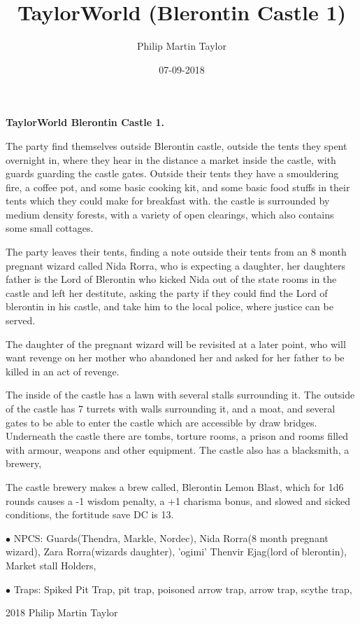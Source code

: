 \documentclass[12pt,a4paper]{book}
\date{07-09-2018}
\author{Philip Martin Taylor}
\title{TaylorWorld (Blerontin Castle 1)}
\begin{document}
\begin{center}
\textbf{TaylorWorld\texttrademark \: Blerontin Castle 1.}
\end{center}
\begin{flushleft}
  The party find themselves outside Blerontin castle, outside the tents they spent overnight in, where they hear in the distance a market inside the castle, with guards guarding the castle gates. Outside their tents they have a smouldering fire, a coffee pot, and some basic cooking kit, and some basic food stuffs in their tents which they could make for breakfast with. the castle is surrounded by medium density forests, with a variety of open clearings, which also contains some small cottages.
\end{flushleft}
\begin{flushleft}
  The party leaves their tents, finding a note outside their tents from an 8 month pregnant wizard called Nida Rorra, who is expecting a daughter, her daughters father is the Lord of Blerontin who kicked Nida out of the state rooms in the castle and left her destitute, asking the party if they could find the Lord of blerontin in his castle, and take him to the local police, where justice can be served.
\end{flushleft}
\begin{flushleft}
  The daughter of the pregnant wizard will be revisited at a later point, who will want revenge on her mother who abandoned her and asked for her father to be killed in an act of revenge.
\end{flushleft}
\begin{flushleft}
  The inside of the castle has a lawn with several stalls surrounding it. The outside of the castle has 7 turrets with walls surrounding it, and a moat, and several gates to be able to enter the castle which are accessible by draw bridges. Underneath the castle there are tombs, torture rooms, a prison and rooms filled with armour, weapons and other equipment. The castle also has a blacksmith, a brewery, 
\end{flushleft}
\begin{flushleft}
  The castle brewery makes a brew called, Blerontin Lemon Blast, which for 1d6 rounds causes a -1 wisdom penalty, a +1 charisma bonus, and slowed and sicked conditions, the fortitude save DC is 13.
\end{flushleft}
\begin{flushleft}
\item[$\bullet$ NPCS:] Guards(Thendra, Markle, Nordec), Nida Rorra(8 month pregnant wizard), Zara Rorra(wizards daughter), 'ogimi' Thenvir Ejag(lord of blerontin), Market stall Holders, 
  \item[$\bullet$ Traps:] Spiked Pit Trap, pit trap, poisoned arrow trap, arrow trap, scythe trap, 
\end{flushleft}
\begin{center}
  \textcopyright{} 2018 Philip Martin Taylor
\end{center}
\end{document}
